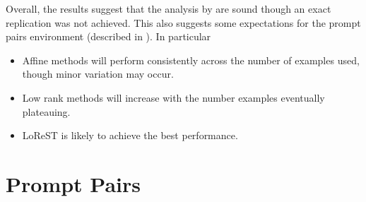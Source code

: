 Overall, the results suggest that the analysis by \citet{steering-clear} are sound though an exact replication was not achieved.
This also suggests some expectations for the prompt pairs environment (described in ).
In particular
\begin{itemize}[nolistsep]
    \item Affine methods will perform consistently across the number of examples used, though minor variation may occur.
    \item Low rank methods will increase with the number examples eventually plateauing.
    \item LoReST is likely to achieve the best performance.
\end{itemize}

\section{Prompt Pairs}

